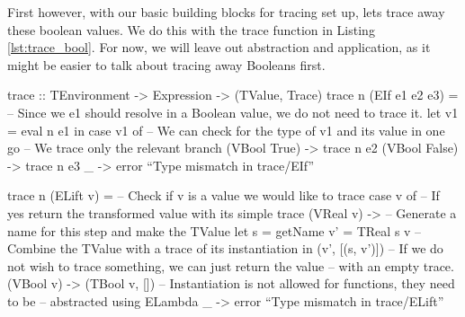         First however, with our basic building blocks for tracing set up, lets trace away these boolean values.
        We do this with the trace function in Listing \ref{lst:trace_bool}.
        For now, we will leave out abstraction and application, as it might be easier to talk about tracing away Booleans first.

        \begin{haskell}[caption=Tracing away Boolean values, label=lst:trace_bool, gobble=12]
            trace :: TEnvironment -> Expression -> (TValue, Trace)
            trace n (EIf e1 e2 e3) =
                -- Since we e1 should resolve in a Boolean value, we do not need to trace it.
                let v1 = eval n e1
                in  case v1 of
                    -- We can check for the type of v1 and its value in one go
                    -- We trace only the relevant branch
                    (VBool True)  -> trace n e2
                    (VBool False) -> trace n e3
                    _             -> error ``Type mismatch in trace/EIf''
            
            trace n (ELift v) =
                -- Check if v is a value we would like to trace
                case v of
                    -- If yes return the transformed value with its simple trace
                    (VReal v) ->
                        -- Generate a name for this step and make the TValue
                        let s  = getName
                            v' = TReal s v
                        -- Combine the TValue with a trace of its instantiation
                        in  (v', [(s, v')])
                    -- If we do not wish to trace something, we can just return the value 
                    -- with an empty trace.
                    (VBool v) -> (TBool v, [])
                    -- Instantiation is not allowed for functions, they need to be 
                    -- abstracted using ELambda
                    _         -> error ``Type mismatch in trace/ELift''


\end{haskell}
